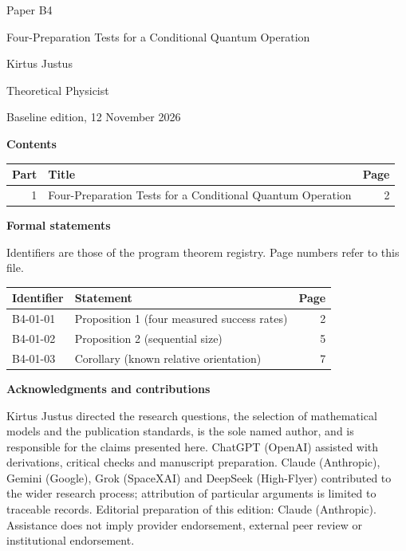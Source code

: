 \documentclass[11pt,a4paper]{article}
\begin{document}
\thispagestyle{empty}\pagestyle{empty}
{\small\sffamily \ProgramTitle\hfill Paper B4\par}
\vspace*{12mm}
{\LARGE\bfseries\raggedright{} Four-Preparation Tests for a Conditional Quantum Operation\par}
\vspace{9mm}
{\large Kirtus Justus\par}\vspace{1mm}Theoretical Physicist\par\AuthorLocation\par\vspace{2mm}Baseline edition, 12 November 2026\par\vspace{8mm}
\textbf{Contents}\par\vspace{1mm}
{\small\begin{longtable}{@{}r>{\raggedright\arraybackslash}p{}r@{}}
\toprule Part & Title & Page\\\midrule\endhead
1 & Four-Preparation Tests for a Conditional Quantum Operation & 2\\
\bottomrule\end{longtable}}
\vspace{2mm}\textbf{Formal statements}\par\vspace{1mm}
{\footnotesize Identifiers are those of the program theorem registry. Page numbers refer to this file.\par}
{\footnotesize\begin{longtable}{@{}l>{\raggedright\arraybackslash}p{}r@{}}
\toprule Identifier & Statement & Page\\\midrule\endhead
B4-01-01 & Proposition 1 (four measured success rates) & 2\\
B4-01-02 & Proposition 2 (sequential size) & 5\\
B4-01-03 & Corollary (known relative orientation) & 7\\
\bottomrule\end{longtable}}
\vspace{3mm}\textbf{Acknowledgments and contributions}\par
{\small Kirtus Justus directed the research questions, the selection of mathematical models and the publication standards, is the sole named author, and is responsible for the claims presented here. ChatGPT (OpenAI) assisted with derivations, critical checks and manuscript preparation. Claude (Anthropic), Gemini (Google), Grok (SpaceXAI) and DeepSeek (High-Flyer) contributed to the wider research process; attribution of particular arguments is limited to traceable records. Editorial preparation of this edition: Claude (Anthropic). Assistance does not imply provider endorsement, external peer review or institutional endorsement.\par}
\end{document}
